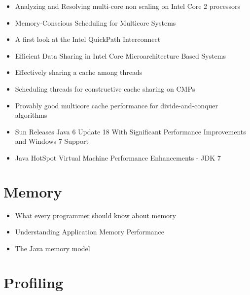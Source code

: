\begin{itemize}
\item[\textbullet] Analyzing and Resolving multi-core non scaling on
  Intel Core 2 processors \cite{Levinthal2007}
\item[\textbullet] Memory-Conscious Scheduling for Multicore Systems
  \cite{Majo2010}
\item[\checkmark] A first look at the Intel QuickPath Interconnect
  \cite{Maddox2009}
\item[\textbullet] Efficient Data Sharing in Intel
  \textsuperscript{\textregistered} Core Microarchitecture Based
  Systems \cite{Shemer2007}
\item[\textbullet] Effectively sharing a cache among threads
  \cite{Blelloch2004}
\item[\textbullet] Scheduling threads for constructive cache sharing
  on CMPs \cite{Chen2007}
\item[\textbullet] Provably good multicore cache performance for
  divide-and-conquer algorithms \cite{Blelloch2008}
\item[\checkmark] Sun Releases Java 6 Update 18 With Significant
  Performance Improvements and Windows 7 Support \cite{Humble2010}
\item[\checkmark] Java HotSpot Virtual Machine Performance
  Enhancements - JDK 7 \cite{Oracle2010}
\end{itemize}


\section*{Memory}
\label{sec:lr-memory}

\begin{itemize}
\item[\textbullet] What every programmer should know about memory
  \cite{Drepper2007}
\item[\textbullet] Understanding Application Memory Performance
  \cite{Drepper2008}
\item[\textbullet] The Java memory model \cite{Manson2005}
\end{itemize}


\section*{Profiling}
\label{sec:lr-profiling}


